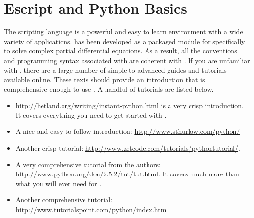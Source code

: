
%
%
%

\section{Escript and Python Basics} \label{sec:escpybas}

The \pyt scripting language is a powerful and easy to learn environment with a wide variety of applications. \esc has been developed as a packaged module for \pyt specifically to solve complex partial differential equations. As a result, all the conventions and programming syntax associated with \pyt are coherent with \esc. If you are unfamiliar with \pyt, there are a large number of simple to advanced guides and tutorials available online. These texts should provide an introduction that is comprehensive enough to use \esc. A handful of \pyt tutorials are listed below.
\begin{itemize}
\item \url{http://hetland.org/writing/instant-python.html} is a very crisp introduction. It covers everything you need to get started with \esc.
\item A nice and easy to follow introduction: \url{http://www.sthurlow.com/python/}
\item Another crisp tutorial: \url{http://www.zetcode.com/tutorials/pythontutorial/}. 
 \item A very comprehensive tutorial from the \pyt authors: \url{http://www.python.org/doc/2.5.2/tut/tut.html}. It covers much more than what you will ever need for \esc.
\item Another comprehensive tutorial: \url{http://www.tutorialspoint.com/python/index.htm}
\end{itemize} 

